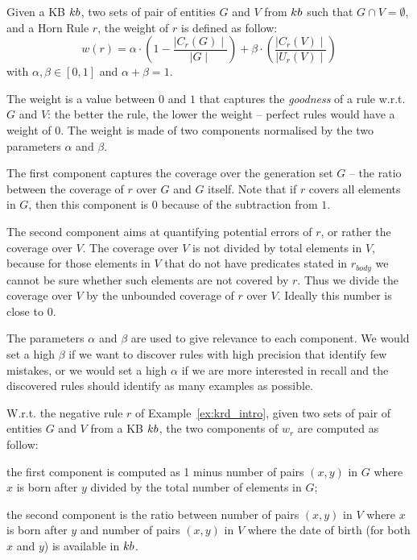 \begin{definition}
	Given a KB ${\sc kb}$, two sets of pair of entities $G$ and $V$ from ${\sc kb}$ such that $G \cap V = \emptyset$, and a Horn Rule $r$, the weight of $r$ is defined as follow:
	\begin{equation} \label{eq:weight_fun}
	w(r) = \alpha \cdot (1-\frac{\mid C_{r}(G)\mid}{\mid G \mid}) +\beta \cdot (\frac{\mid C_{r}(V) \mid}{\mid U_{r}(V)\mid})
	\end{equation}
	with $\alpha,\beta \in [0,1]$ and $\alpha + \beta = 1$. 
\end{definition}
The weight is a value between $0$ and $1$ that captures the \emph{goodness} of a rule w.r.t. $G$ and $V$: the better the rule, the lower the weight -- perfect rules would have a weight of $0$. The weight is made of two components normalised by the two parameters $\alpha$ and $\beta$.
\begin{inparaenum}[\itshape1)]
	\item The first component captures the coverage over the generation set $G$ -- the ratio between the coverage of $r$ over $G$ and $G$ itself. Note that if $r$ covers all elements in $G$, then this component is $0$ because of the subtraction from $1$.
	\item The second component aims at quantifying potential errors of $r$, or rather the coverage over $V$. The coverage over $V$ is not divided by total elements in $V$, because 
	for those elements in $V$ that do not have predicates stated in $r_{body}$ we 
	cannot be sure whether such elements are not covered by $r$. Thus we divide the coverage over $V$ by the unbounded coverage of $r$ over $V$. Ideally this number is close to $0$.
\end{inparaenum}
The parameters $\alpha$ and $\beta$ are used to give relevance to each component. We would set a high $\beta$ if we want to discover rules with high precision that identify few mistakes, or we would set a high $\alpha$ if we are more interested in recall and the discovered rules should identify as many examples as possible.

\begin{example}
	W.r.t. the negative rule $r$ of Example~\ref{ex:krd_intro}, given two sets of pair of entities $G$ and $V$ from a KB ${\sc kb}$, the two components of $w_r$ are computed as follow:
	\begin{inparaenum}[\itshape1)]
		\item the first component is computed as 1 minus number of pairs $(x,y)$ in $G$ where
		$x$ is born after $y$ divided by the total number of elements in $G$;
		\item the second component is the ratio between number of pairs $(x,y)$ in $V$ where $x$ is born after $y$ and number of pairs $(x,y)$ in $V$ where the date of birth (for both $x$ and $y$) is available in ${\sc kb}$.
	\end{inparaenum}
\end{example}

